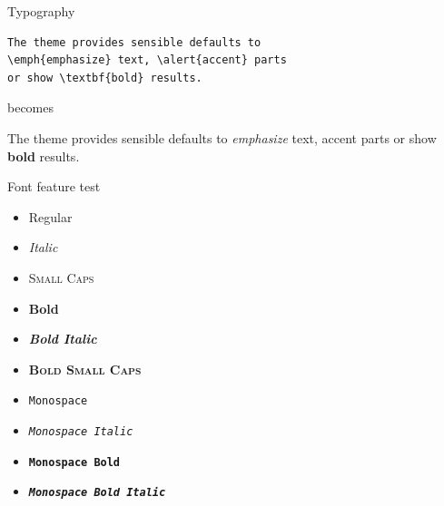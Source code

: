 \documentclass[10pt,spanish,xcolor={svgnames}]{beamer}
\begin{document}
\begin{frame}[fragile]{Typography}
\begin{verbatim}The theme provides sensible defaults to
\emph{emphasize} text, \alert{accent} parts
or show \textbf{bold} results.\end{verbatim}

\begin{center}becomes\end{center}

The theme provides sensible defaults to \emph{emphasize} text,
\alert{accent} parts or show \textbf{bold} results.
\end{frame}

\begin{frame}{Font feature test}
\begin{itemize}
\item Regular
\item \textit{Italic}
\item \textsc{Small Caps}
\item \textbf{Bold}
\item \textbf{\textit{Bold Italic}}
\item \textbf{\textsc{Bold Small Caps}}
\item \texttt{Monospace}
\item \texttt{\textit{Monospace Italic}}
\item \texttt{\textbf{Monospace Bold}}
\item \texttt{\textbf{\textit{Monospace Bold Italic}}}
\end{itemize}
\end{frame}
\end{document}
